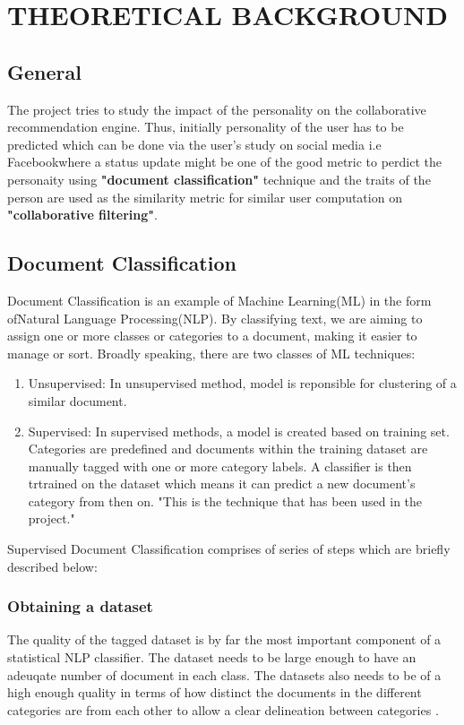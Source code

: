 \newpage
\section{THEORETICAL BACKGROUND}
\subsection{General}
The project tries to study the impact of the personality on the collaborative recommendation engine. Thus, initially personality of the user has to be predicted which can be done via the user's study on social media i.e Facebookwhere a status update might be one of the good metric to perdict the personaity using \textbf{"document classification"} technique and the traits of the person are used as the similarity metric for similar user computation on \textbf{"collaborative filtering"}.

\subsection{Document Classification}
Document Classification is an example of Machine Learning(ML) in the form ofNatural Language Processing(NLP). By classifying text, we are aiming to assign one or more classes or categories to a document, making it easier to manage or sort. 
Broadly speaking, there are two classes of ML techniques:
\begin{enumerate}
\item Unsupervised: In unsupervised method, model is reponsible for clustering of a similar document.
\item Supervised: In supervised methods, a model is created based on training set. Categories are predefined and documents within the training dataset are manually tagged with one or more category labels. A classifier is then trtrained on the dataset which means it can predict a new document's category from then on. "This is the technique that has been used in the project."
\end{enumerate}

Supervised Document Classification comprises of series of steps which are briefly described below:
\subsubsection{Obtaining a dataset}
The quality of the tagged dataset is by far the most important component of a statistical NLP classifier. The dataset needs to be large enough to have an adeuqate number of document in each class. The datasets also needs to be of a high enough quality in terms of how distinct the documents in the different categories are from each other to allow a clear delineation between categories \cite{kd}.

